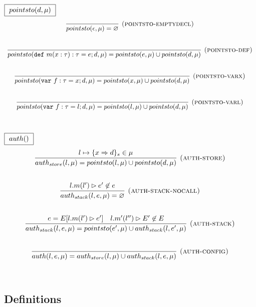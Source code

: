 \documentclass{llncs}
\newcommand{\keywadj}[1]{\mathtt{#1}}
\newcommand{\keyw}[1]{\keywadj{#1}~}
\begin{document}
\vspace{-6pt}
$\fbox{$~pointsto(d, \mu)~$}$
\[
\begin{array}{c}
\infer[\textsc{(pointsto-emptydecl)}]
  {pointsto(\epsilon,\mu) = \varnothing}
  {}\\[5ex]

\infer[\textsc{(pointsto-def)}]
  {pointsto(\keyw{def} m(x:\tau):\tau = e; d,\mu) = pointsto(e,\mu) \cup pointsto(d,\mu)}
  {}\\[5ex]
  
\infer[\textsc{(pointsto-varx)}]
  {pointsto(\keyw{var} f:\tau = x; d,\mu) = pointsto(x,\mu) \cup pointsto(d,\mu)}
  {}\\[5ex]

\infer[\textsc{(pointsto-varl)}]
  {pointsto(\keyw{var} f:\tau = l; d,\mu) = pointsto(l,\mu) \cup pointsto(d,\mu)}
  {}\\[5ex]

\end{array}
\]

\vspace{-6pt}
$\fbox{$~auth()~$}$
\[
\begin{array}{c}
\infer[\textsc{(auth-store)}]
  {auth_{store}(l,\mu) = pointsto(l, \mu) \cup pointsto(d,\mu)}
  {l \mapsto \{ x \Rightarrow d \}_{s} \in \mu}\\[5ex]

\infer[\textsc{(auth-stack-nocall)}]
  {auth_{stack}(l,e,\mu) = \varnothing}
  {l.m(l') \rhd e' \not\in e}\\[5ex]
\infer[\textsc{(auth-stack)}]
  {auth_{stack}(l, e, \mu) = pointsto(e',\mu) \cup auth_{stack}(l,e',\mu)}
  {e = E[l.m(l') \rhd e'] & l.m'(l'') \rhd E' \not\in E}\\[5ex]
  
\infer[\textsc{(auth-config)}]
  {auth(l,e, \mu) = auth_{store}(l,\mu) \cup auth_{stack}(l,e,\mu)}
  {}\\[5ex]

\end{array}
\]

\newpage

\subsection{Definitions}
\label{sec:definitions}
\end{document}
